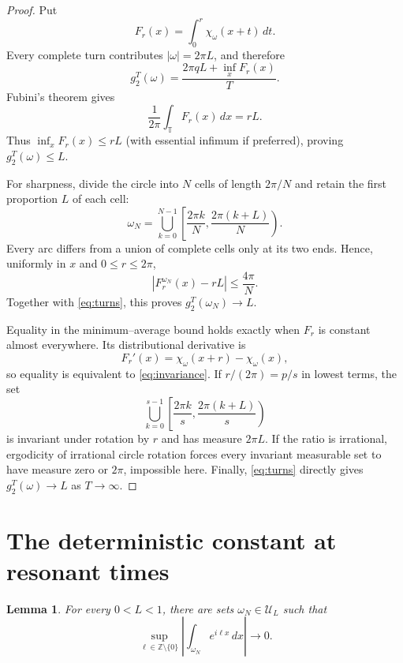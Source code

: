 \documentclass[11pt]{article}
\newtheorem{lemma}[theorem]{Lemma}
\newcommand{\Torus}{\mathbb T}
\newcommand{\Ucal}{\mathcal U}
\begin{document}
\begin{proof}
Put
\[
 F_r(x)=\int_0^r\chi_\omega(x+t)\,dt.
\]
Every complete turn contributes $|\omega|=2\pi L$, and therefore
\begin{equation}\label{eq:turns}
 g_2^T(\omega)=\frac{2\pi qL+\inf_xF_r(x)}{T}.
\end{equation}
Fubini's theorem gives
\[
 \frac1{2\pi}\int_\Torus F_r(x)\,dx=rL.
\]
Thus $\inf_xF_r(x)\leq rL$ (with essential infimum if preferred), proving
$g_2^T(\omega)\leq L$.

For sharpness, divide the circle into $N$ cells of length $2\pi/N$ and retain
the first proportion $L$ of each cell:
\[
 \omega_N=\bigcup_{k=0}^{N-1}
 \left[\frac{2\pi k}{N},\frac{2\pi(k+L)}N\right).
\]
Every arc differs from a union of complete cells only at its two ends.  Hence,
uniformly in $x$ and $0\leq r\leq2\pi$,
\[
 \left|F_r^{\omega_N}(x)-rL\right|\leq\frac{4\pi}{N}.
\]
Together with \eqref{eq:turns}, this proves
$g_2^T(\omega_N)\to L$.

Equality in the minimum--average bound holds exactly when $F_r$ is constant
almost everywhere.  Its distributional derivative is
\[
 F_r'(x)=\chi_\omega(x+r)-\chi_\omega(x),
\]
so equality is equivalent to \eqref{eq:invariance}.  If
$r/(2\pi)=p/s$ in lowest terms, the set
\[
 \bigcup_{k=0}^{s-1}
 \left[\frac{2\pi k}{s},\frac{2\pi(k+L)}s\right)
\]
is invariant under rotation by $r$ and has measure $2\pi L$.  If the ratio is
irrational, ergodicity of irrational circle rotation forces every invariant
measurable set to have measure zero or $2\pi$, impossible here.  Finally,
\eqref{eq:turns} directly gives $g_2^T(\omega)\to L$ as $T\to\infty$.
\end{proof}

\section*{The deterministic constant at resonant times}

\begin{lemma}\label{lem:flat}
For every $0<L<1$, there are sets $\omega_N\in\Ucal_L$ such that
\begin{equation}\label{eq:flat}
 \sup_{\ell\in\mathbb Z\setminus\{0\}}
 \left|\int_{\omega_N}e^{i\ell x}\,dx\right|\longrightarrow0.
\end{equation}
\end{lemma}
\end{document}
